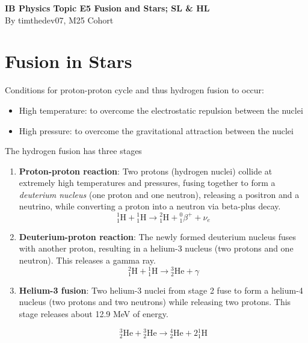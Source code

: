 \documentclass[a4paper,12pt]{article}
\let\oldsection\section
\renewcommand\section{\clearpage\oldsection}
\newcommand{\atom}[3]{{}^{#1}_{#2}\text{#3}}
\begin{document}
\pagestyle{fancy}


\begin{titlepage}
  \begin{center}

    \vspace*{8cm}
    \textbf{\Large {IB Physics Topic E5 Fusion and Stars; SL \& HL}} \\
    \vspace*{1cm}
    \large{By timthedev07, M25 Cohort}

  \end{center}
\end{titlepage}

\pagebreak
\tableofcontents
\pagebreak

\clearpage
\setcounter{page}{1}

\section{Fusion in Stars}

Conditions for proton-proton cycle and thus hydrogen fusion to occur:
\begin{itemize}
  \item High temperature: to overcome the electrostatic repulsion between the nuclei
  \item High pressure: to overcome the gravitational attraction between the nuclei
\end{itemize}

The hydrogen fusion has three stages
\begin{enumerate}
  \item \textbf{Proton-proton reaction}: Two protons (hydrogen nuclei) collide at extremely high temperatures and pressures, fusing together to form a \textit{deuterium nucleus} (one proton and one neutron), releasing a positron and a neutrino, while converting a proton into a neutron via beta-plus decay.
        \[
          \atom{1}{1}{H} + \atom{1}{1}{H} \rightarrow \atom{2}{1}{H} + \atom{0}{1}{$\beta$}^{+} + \nu_e
        \]
  \item \textbf{Deuterium-proton reaction}: The newly formed deuterium nucleus fuses with another proton, resulting in a helium-3 nucleus (two protons and one neutron). This releases a gamma ray.
        \[
          \atom{2}{1}{H} + \atom{1}{1}{H} \rightarrow \atom{3}{2}{He} + \gamma
        \]
  \item \textbf{Helium-3 fusion}: Two helium-3 nuclei from stage 2 fuse to form a helium-4 nucleus (two protons and two neutrons) while releasing two protons. This stage releases about 12.9 MeV of energy.

        \[
          \atom{3}{2}{He} + \atom{3}{2}{He} \rightarrow \atom{4}{2}{He} + 2\atom{1}{1}{H}
        \]
\end{enumerate}
\end{document}
